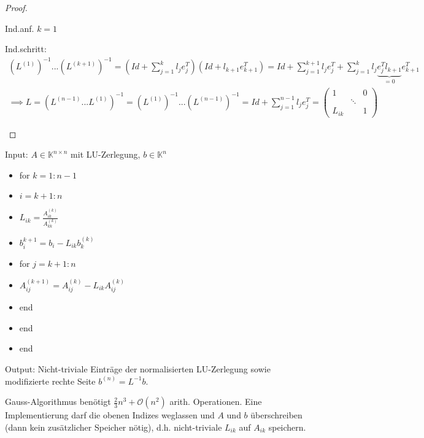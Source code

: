 \begin{proof}
\begin{enumerate}
		Ind.anf. $k=1$\checkmark
		
		Ind.schritt:
		\begin{align*}
			(L^{(1)})^{-1} ... (L^{(k+1)})^{-1} = (Id + \sum_{j=1}^{k} l_j e_j^T) (Id + l_{k+1}e_{k+1}^T) =
			Id + \sum_{j=1}^{k+1} l_j e_j^T + \sum_{j=1}^{k} l_j \underbrace{e_j^T l_{k+1}}_{=0} e_{k+1}^T\\
			\implies L = (L^{(n-1)} ... L^{(1)})^{-1} = (L^{(1)})^{-1} ... (L^{(n-1)})^{-1} =
			Id + \sum_{j=1}^{n-1} l_j e_j^T = \left(\begin{matrix}
				1 & & 0\\
				 &\ddots&\\
				 L_{ik} & &1
			\end{matrix}\right)
		\end{align*}
	\end{enumerate}
\end{proof}

\begin{algorithm}[Implementierung]
	Input: $A \in \mathbb{K}^{n \times n}$ mit LU-Zerlegung, $b \in \mathbb{K}^n$
	
	\begin{itemize}
		\item for $k=1:n-1$
		\item \hspace{0.5cm} $i=k+1:n$
		\item \hspace{1cm} $L_{ik} = \frac{A_{ik}^{(k)}}{A_{kk}^{(k)}}$
		\item \hspace{1cm} $b_i^{k+1} = b_i - L_{ik} b_k^{(k)}$
		\item \hspace{1cm} for $j=k+1:n$
		\item \hspace{1.5cm} $A_{ij}^{(k+1)} = A_{ij}^{(k)} - L_{ik}A_{ij}^{(k)}$
		\item \hspace{1cm} end
		\item \hspace{0.5cm} end
		\item end
	\end{itemize}
	
	Output: Nicht-triviale Einträge der normalisierten LU-Zerlegung sowie modifizierte rechte Seite $b^{(n)} = L^{-1}b$.
\end{algorithm}

\begin{lemma}
	Gauss-Algorithmus benötigt $\frac{2}{3} n^3 + \mathcal{O}(n^2)$ arith. Operationen. Eine Implementierung darf die obenen Indizes weglassen und $A$ und $b$ überschreiben (dann kein zusätzlicher Speicher nötig), d.h. nicht-triviale $L_{ik}$ auf $A_{ik}$ speichern.
\end{lemma}

